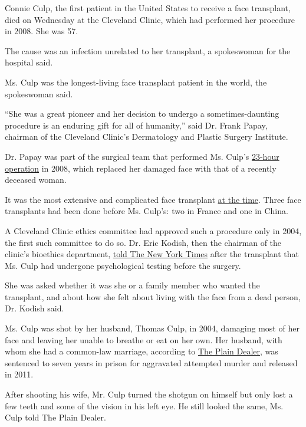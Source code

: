 Connie Culp, the first patient in the United States to receive a face
transplant, died on Wednesday at the Cleveland Clinic, which had
performed her procedure in 2008. She was 57.

The cause was an infection unrelated to her transplant, a spokeswoman
for the hospital said.

Ms. Culp was the longest-living face transplant patient in the world,
the spokeswoman said.

``She was a great pioneer and her decision to undergo a
sometimes-daunting procedure is an enduring gift for all of humanity,''
said Dr. Frank Papay, chairman of the Cleveland Clinic's Dermatology and
Plastic Surgery Institute.

Dr. Papay was part of the surgical team that performed Ms. Culp's
\href{https://www.nytimes3xbfgragh.onion/2008/12/18/health/s18face.html}{23-hour
operation} in 2008, which replaced her damaged face with that of a
recently deceased woman.

It was the most extensive and complicated face transplant
\href{https://www.nytimes3xbfgragh.onion/2008/12/17/health/17face.html}{at
the time}. Three face transplants had been done before Ms. Culp's: two
in France and one in China.

A Cleveland Clinic ethics committee had approved such a procedure only
in 2004, the first such committee to do so. Dr. Eric Kodish, then the
chairman of the clinic's bioethics department,
\href{https://www.nytimes3xbfgragh.onion/2008/12/18/health/s18face.html}{told
The New York Times} after the transplant that Ms. Culp had undergone
psychological testing before the surgery.

She was asked whether it was she or a family member who wanted the
transplant, and about how she felt about living with the face from a
dead person, Dr. Kodish said.

Ms. Culp was shot by her husband, Thomas Culp, in 2004, damaging most of
her face and leaving her unable to breathe or eat on her own. Her
husband, with whom she had a common-law marriage, according to
\href{https://www.cleveland.com/healthfit/2010/11/woman_who_underwent_first_near.html}{The
Plain Dealer}, was sentenced to seven years in prison for aggravated
attempted murder and released in 2011.

After shooting his wife, Mr. Culp turned the shotgun on himself but only
lost a few teeth and some of the vision in his left eye. He still looked
the same, Ms. Culp told The Plain Dealer.

